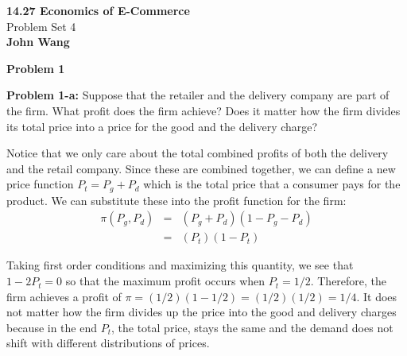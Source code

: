 \documentclass[psamsfonts]{amsart}
\newenvironment{sol}{\vspace{0.25cm}{\large \bfseries Solution:}}{\qedsymbol}
\newenvironment{prob}[1]{\begin{framed}{\large \bfseries Problem #1:}}{\end{framed}}
\newcommand{\makenewtitle}{
    \begin{center}
    {\huge \bfseries 14.27 Economics of E-Commerce} \\
    Problem Set 4\\
    \vspace{0.25cm}
    {\bfseries John Wang} 
    \end{center}
    \vspace{0.5cm}
}
\begin{document}
\makenewtitle

\begin{center}
{\Large \bfseries Problem 1}
\end{center}

\begin{prob}{1-a}
Suppose that the retailer and the delivery company are part of the firm. What profit does the firm achieve? Does it matter how the firm divides its total price into a price for the good and the delivery charge?
\end{prob}
\begin{sol}
Notice that we only care about the total combined profits of both the delivery and the retail company. Since these are combined together, we can define a new price function $P_t = P_g + P_d$ which is the total price that a consumer pays for the product. We can substitute these into the profit function for the firm:
\begin{eqnarray}
\pi(P_g, P_d) &=& (P_g + P_d) (1 - P_g - P_d) \\
 &=& (P_t)(1 - P_t)
\end{eqnarray}

Taking first order conditions and maximizing this quantity, we see that $1 - 2 P_t = 0$ so that the maximum profit occurs when $P_t = 1/2$. Therefore, the firm achieves a profit of $\pi = (1/2)(1 - 1/2) = (1/2)(1/2) = 1/4$. It does not matter how the firm divides up the price into the good and delivery charges because in the end $P_t$, the total price, stays the same and the demand does not shift with different distributions of prices.
\end{sol}
\end{document}
